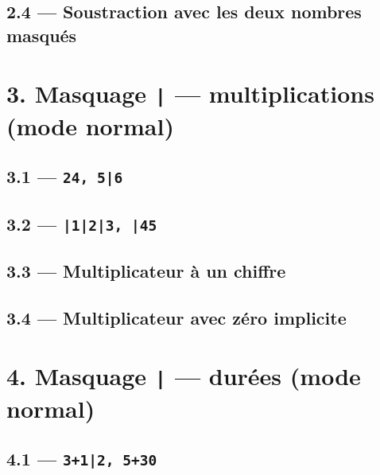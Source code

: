 \documentclass[12pt]{extarticle}
\begin{document}
\subsection*{2.4 — Soustraction avec les deux nombres masqués}


\section*{3. Masquage \texttt{|} — multiplications (mode normal)}

\subsection*{3.1 — \texttt{24, 5|6}}


\subsection*{3.2 — \texttt{|1|2|3, |45}}


\subsection*{3.3 — Multiplicateur à un chiffre}


\subsection*{3.4 — Multiplicateur avec zéro implicite}


\section*{4. Masquage \texttt{|} — durées (mode normal)}

\subsection*{4.1 — \texttt{3+1|2, 5+30}}
\end{document}
